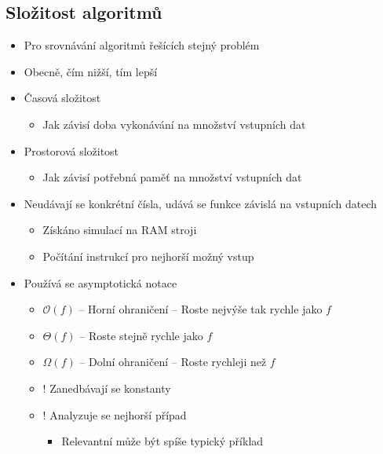 \documentclass[openany]{book}
\begin{document}
\subsection{Složitost algoritmů}
\begin{itemize}
    \item Pro srovnávání algoritmů řešících stejný problém
    \item Obecně, čím nižší, tím lepší
    \item Časová složitost
    \begin{itemize}
        \item Jak závisí doba vykonávání na množství vstupních dat
    \end{itemize}
    \item Prostorová složitost
    \begin{itemize}
        \item Jak závisí potřebná paměť na množství vstupních dat
    \end{itemize}
    \item Neudávají se konkrétní čísla, udává se funkce závislá na vstupních datech
    \begin{itemize}
        \item Získáno simulací na RAM stroji
        \item Počítání instrukcí pro nejhorší možný vstup
    \end{itemize}
    \item Používá se asymptotická notace
    \begin{itemize}
        \item \(\mathcal{O}\left( f \right)\) --  Horní ohraničení -- Roste nejvýše tak rychle jako \(f\)
        \item \(\Theta\left( f \right)\) -- Roste stejně rychle jako  \(f\)
        \item \(\Omega\left( f \right)\) -- Dolní ohraničení -- Roste rychleji než \(f\)
        \item \(\mathcal{!}\) Zanedbávají se konstanty
        \item \(\mathcal{!}\) Analyzuje se nejhorší případ
        \begin{itemize}
            \item Relevantní může být spíše typický příklad
        \end{itemize}
    \end{itemize}
\end{itemize}
\end{document}
